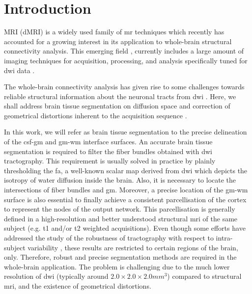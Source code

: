 \section{Introduction}
\label{sec:introduction}
% 
% 
% 
% 
%
 MRI (dMRI) is a widely used family of \gls{mr} techniques
\citep{sundgren_diffusion_2004} which recently has accounted for a growing
interest in its application to whole-brain structural connectivity analysis.
This emerging field \citep{hagmann_diffusion_2005,sporns_human_2005}, currently 
includes a large amount of imaging techniques for acquisition, processing, 
and analysis specifically tuned for \gls{dwi} data \citep{daducci_connectome_2012}.

The whole-brain connectivity analysis has given rise to some challenges
towards reliable structural information about the neuronal tracts 
from \gls{dwi} \cite{johansen-berg_using_2009,jones_white_2012}. 
Here, we shall address brain tissue segmentation on diffusion space 
and correction of geometrical distortions inherent to the acquisition 
sequence \citep{hagmann_mr_2012}.

In this work, we will refer as brain tissue segmentation to the precise
delineation of the \gls{csf}-\gls{gm} and \gls{gm}-\gls{wm} interface surfaces.
An accurate brain tissue segmentation is required
to filter the fiber bundles obtained with \gls{dwi} tractography. 
This requirement is usually solved in practice by plainly thresholding the 
\gls{fa}, a well-known scalar map derived from \gls{dwi} which depicts 
the isotropy of water diffusion inside the brain. Also,
it is necessary to locate the intersections of fiber bundles and \gls{gm}.
Moreover, a precise location of the \gls{gm}-\gls{wm} surface is also essential 
to finally achieve a consistent parcellisation of the cortex 
to represent the nodes of the output network. This parcellisation 
is generally defined in a high-resolution and better understood structural 
\gls{mri} of the same 
subject (e.g. \gls{t1} and/or \gls{t2} weighted acquisitions). Even though
some efforts have addressed the study of the robustness of tractography with
respect to intra-subject variability \cite{heiervang_between_2006,
wakana_reproducibility_2007}, these results are restricted to certain regions 
of the brain, only. Therefore, robust and precise segmentation methods are 
required in the whole-brain application. The problem is challenging due to
the much lower resolution of \gls{dwi} (typically around 
$2.0\times2.0\times2.0mm^3$) compared to structural \gls{mri}, and the
existence of geometrical distortions.

